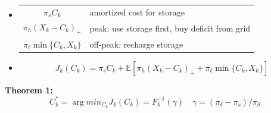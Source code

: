 \documentclass[a0,portrait]{a0poster}
\begin{document}
\begin{multicols}{3}
\begin{itemize}
\item {}

\begin{tabular}{c|l}
$\pi_{s} C_{k}$ & amortized cost for storage \\
$\pi_{h} (X_{k} - C_{k})_{+}$ & peak:  use storage first, buy deficit from grid \\
$ \pi_{\ell} \min\{C_{k}, X_{k}\}$ & off-peak: recharge storage
\end{tabular}
%
\item {}
\begin{equation*}
J_{k}(C_{k}) = \pi_{s} C_{k} + \mathbb{E}\left[\pi_{h} (X_{k} - C_{k})_{+} + \pi_{\ell} \min\{C_{k}, X_{k}\}  \right]
\end{equation*}
\vspace{-0.5cm}
\end{itemize}

\noindent \textbf{Theorem 1: }
\begin{equation}\nonumber
 C^{*}_{k} = \arg  min_{C_{k}} J_{k}(C_{k})  =   F^{-1}_{k}(\gamma) \quad \gamma = (\pi_{\delta} - \pi_{s})/\pi_{\delta}
\end{equation}





\end{multicols}
\end{document}

